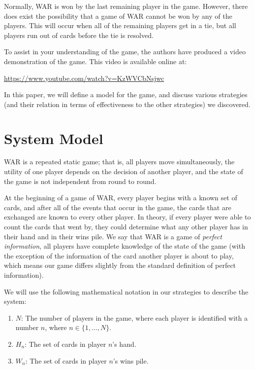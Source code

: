 \documentclass[conference]{IEEEtran}
\begin{document}
Normally, WAR is won by the last remaining player in the game. However, there
does exist the possibility that a game of WAR cannot be won by any of the
players. This will occur when all of the remaining players get in a tie, but
all players run out of cards before the tie is resolved.

To assist in your understanding of the game, the authors have produced a video
demonstration of the game. This video is available online at:
\begin{center}
\url{https://www.youtube.com/watch?v=KzWVCbNsjwc}
\end{center}

In this paper, we will define a model for the game, and discuss various
strategies (and their relation in terms of effectiveness to the other
strategies) we discovered.

\section{System Model}

WAR is a repeated static game; that is, all players move simultaneously, the
utility of one player depends on the decision of another player, and the state
of the game is not independent from round to round.

At the beginning of a game of WAR, every player begins with a known set of
cards, and after all of the events that occur in the game, the cards that are
exchanged are known to every other player. In theory, if every player were able
to count the cards that went by, they could determine what any other player has
in their hand and in their wins pile. We say that WAR is a game of \emph{perfect
information}, all players have complete knowledge of the state of the game
(with the exception of the information of the card another player is about to
play, which means our game differs slightly from the standard definition of
perfect information).

We will use the following mathematical notation in our strategies to describe
the system:
\begin{enumerate}
    \item $N$: The number of players in the game, where each player is
        identified with a number $n$, where $n \in \{1, \ldots{}, N\}$.
    \item $H_n$: The set of cards in player $n$'s hand.
    \item $W_n$: The set of cards in player $n$'s wins pile.
\end{enumerate}
\end{document}
